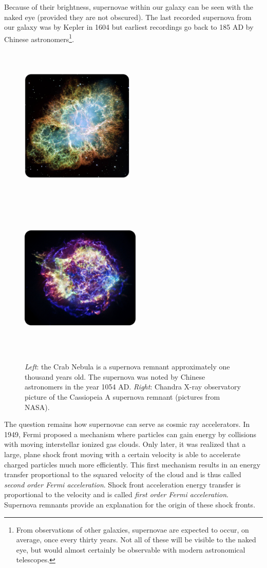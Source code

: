 Because of their brightness, supernovae within our galaxy can be seen with the naked eye (provided they are not obscured). The last recorded supernova from our galaxy was by Kepler in 1604 but earliest recordings go back to 185 AD by Chinese astronomers\footnote{From observations of other galaxies, supernovae are expected to occur, on average, once every thirty years. Not all of these will be visible to the naked eye, but would almost certainly be observable with modern astronomical telescopes.}.
\begin{figure}
\centering
\includegraphics[width=0.48\textwidth,height=7.7cm]{chapter3/img/crabnebula_rounded.jpg}
\includegraphics[width=0.51\textwidth,height=7.7cm]{chapter3/img/casa_rounded_resized.jpg}
\caption{\textit{Left}: the Crab Nebula is a supernova remnant approximately one thousand years old. The supernova was noted by Chinese astronomers in the year 1054 AD. \textit{Right}: Chandra X-ray observatory picture of the Cassiopeia A supernova remnant (pictures from NASA).}
\label{fig:supernova}
\end{figure}
\newline
The question remains how supernovae can serve as cosmic ray accelerators. In 1949, Fermi proposed a mechanism where particles can gain energy by collisions with moving interstellar ionized gas clouds. Only later, it was realized that a large, plane shock front moving with a certain velocity is able to accelerate charged particles much more efficiently. This first mechanism results in an energy transfer proportional to the squared velocity of the cloud and is thus called \textit{second order Fermi acceleration}. Shock front acceleration energy transfer is proportional to the velocity and is called \textit{first order Fermi acceleration}. Supernova remnants provide an explanation for the origin of these shock fronts.

